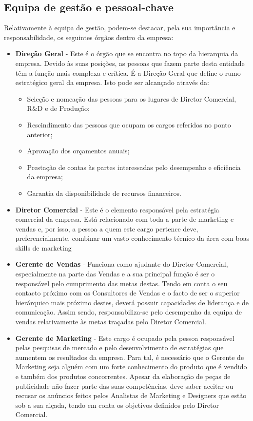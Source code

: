 \documentclass[a4paper]{article}
\begin{document}
\subsection{Equipa de gestão e pessoal-chave }
Relativamente à equipa de gestão, podem-se destacar, pela sua importância e responsabilidade, os seguintes órgãos dentro da empresa:
\begin{itemize}
    \item \textbf{Direção Geral} - Este é o órgão que se encontra no topo da hierarquia da empresa. Devido às suas posições, as pessoas que fazem parte desta entidade têm a função mais complexa e crítica. É a Direção Geral que define o rumo estratégico geral da empresa. Isto pode ser alcançado através da:
    \begin{itemize}
        \item Seleção e nomeação das pessoas para os lugares de Diretor Comercial, R\&D e de Produção;
        \item Rescindimento das pessoas que ocupam os cargos referidos no ponto anterior;
        \item Aprovação dos orçamentos anuais;
        \item Prestação de contas às partes interessadas pelo desempenho e eficiência da empresa;
        \item Garantia da disponibilidade de recursos financeiros.
    \end{itemize}
    \item \textbf{Diretor Comercial} - Este é o elemento responsável pela estratégia comercial da empresa. Está relacionado com toda a parte de marketing e vendas e, por isso, a pessoa a quem este cargo pertence deve, preferencialmente, combinar um vasto conhecimento técnico da área com boas skills de marketing 
    \item \textbf{Gerente de Vendas} - Funciona como ajudante do Diretor Comercial, especialmente na parte das Vendas e a sua principal função é ser o responsável pelo cumprimento das metas destas. Tendo em conta o seu contacto próximo com os Consultores de Vendas e o facto de ser o superior hierárquico mais próximo destes, deverá possuir capacidades de liderança e de comunicação. Assim sendo, responsabiliza-se pelo desempenho da equipa de vendas relativamente às metas traçadas pelo Diretor Comercial.
    \item \textbf{Gerente de Marketing} - Este cargo é ocupado pela pessoa responsável pelas pesquisas de mercado e pelo desenvolvimento de estratégias que aumentem os resultados da empresa. Para tal, é necessário que o Gerente de Marketing seja alguém com um forte conhecimento do produto que é vendido e também dos produtos concorrentes. Apesar da elaboração de peças de publicidade não fazer parte das suas competências, deve saber aceitar ou recusar os anúncios feitos pelos Analistas de Marketing e Designers que estão sob a sua alçada, tendo em conta os objetivos definidos pelo Diretor Comercial.

\end{itemize}
\end{document}
